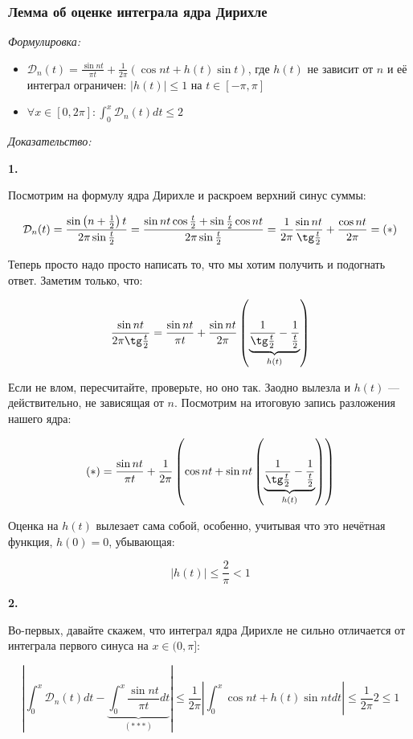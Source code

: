 \documentclass{article}
\def\DD{\mathcal{D}}
\begin{document}
\subsubsection{Лемма об оценке интеграла ядра Дирихле}
\textit{Формулировка:}

\begin{itemize}
    \item $\DD_n(t) = \frac{\sin nt}{\pi t} + \frac{1}{2\pi}(\cos nt + h(t)\sin t)$, где $h(t)$ не зависит от $n$ и её интеграл ограничен: $|h(t)| \le 1$ на $t \in [-\pi, \pi]$
    \item $\forall x \in [0, 2\pi] : \int_{0}^{x} \DD_n(t) dt \le 2$
\end{itemize}

\textit{Доказательство:}

\textbf{1.}

Посмотрим на формулу ядра Дирихле и раскроем верхний синус суммы:

\[\DD_n(t) = \frac{\sin \left(n + \frac{1}{2}\right)t}{2\pi\sin \frac{t}{2}} = \frac{\sin nt \cos\frac{t}{2} + \sin \frac{t}{2} \cos nt}{2\pi\sin \frac{t}{2}} = \frac{1}{2\pi}\frac{\sin nt}{\tg \frac{t}{2}} + \frac{\cos nt}{2\pi} = (*)\]

Теперь просто надо просто написать то, что мы хотим получить и подогнать ответ. Заметим только, что:

\[ \frac{\sin nt}{2 \pi \tg \frac{t}{2}} = \frac{\sin nt}{\pi t} + \frac{\sin nt}{2 \pi} \left(\underbrace{\frac{1}{\tg \frac{t}{2}} - \frac{1}{\frac{t}{2}}}_{h(t)}\right)\]

Если не влом, пересчитайте, проверьте, но оно так. Заодно вылезла и $h(t)$ --- действительно, не зависящая от $n$. Посмотрим на итоговую запись разложения нашего ядра:

\[(*) = \frac{\sin nt}{\pi t} + \frac{1}{2\pi} \left( \cos nt + \sin nt \left(\underbrace{\frac{1}{\tg \frac{t}{2}} - \frac{1}{\frac{t}{2}}}_{h(t)}\right) \right)\]

Оценка на $h(t)$ вылезает сама собой, особенно, учитывая что это нечётная функция, $h(0) = 0$, убывающая:

\[|h(t)| \le \frac{2}{\pi} < 1\]

\textbf{2.}

Во-первых, давайте скажем, что интеграл ядра Дирихле не сильно отличается от интеграла первого синуса на $x \in (0, \pi]$:

\[\left| \int_{0}^{x} \DD_n(t) dt - \underbrace{\int_{0}^{x} \frac{\sin nt}{\pi t} dt}_{(***)}\right| \le \frac{1}{2\pi}\left|\int_{0}^{x} \cos nt + h(t)\sin nt dt\right| \le \frac{1}{2\pi} 2 \le 1\]
\end{document}
